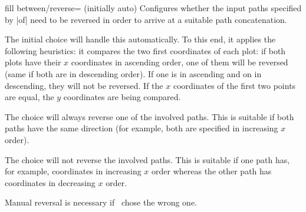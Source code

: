 \begin{tikzkey}{fill between/reverse= (initially auto)}
	Configures whether the input paths specified by |of| need to be reversed in order to arrive at a suitable path concatenation.

	The initial choice  will handle this automatically. To this end, it applies the following heuristics: it compares the two first coordinates of each plot: if both plots have their $x$ coordinates in ascending order, one of them will be reversed (same if both are in descending order). If one is in ascending and on in descending, they will not be reversed. If the $x$ coordinates of the first two points are equal, the $y$ coordinates are being compared.

	The choice  will always reverse one of the involved paths. This is suitable if both paths have the same direction (for example, both are specified in increasing $x$ order).

	The choice  will not reverse the involved paths. This is suitable if one path has, for example, coordinates in increasing $x$ order whereas the other path has coordinates in decreasing $x$ order.

	Manual reversal is necessary if \PGFPlots\ chose the wrong one.
\begin{codeexample}[]
\end{codeexample}

\begin{codeexample}[]
\end{codeexample}
\end{tikzkey}

